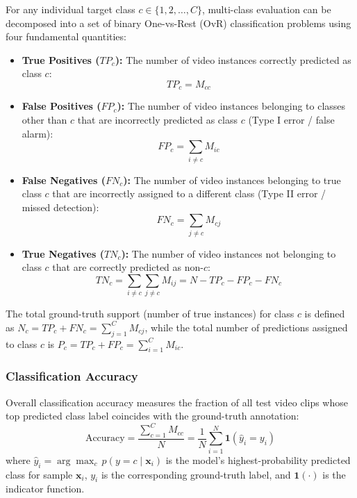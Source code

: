 For any individual target class $c \in \{1, 2, \dots, C\}$, multi-class evaluation can be decomposed into a set of binary One-vs-Rest (OvR) classification problems using four fundamental quantities:
\begin{itemize}[leftmargin=*]
    \item \textbf{True Positives ($TP_c$):} The number of video instances correctly predicted as class $c$:
    \begin{equation}
    TP_c = M_{cc}
    \end{equation}
    \item \textbf{False Positives ($FP_c$):} The number of video instances belonging to classes other than $c$ that are incorrectly predicted as class $c$ (Type I error / false alarm):
    \begin{equation}
    FP_c = \sum_{i \neq c} M_{ic}
    \end{equation}
    \item \textbf{False Negatives ($FN_c$):} The number of video instances belonging to true class $c$ that are incorrectly assigned to a different class (Type II error / missed detection):
    \begin{equation}
    FN_c = \sum_{j \neq c} M_{cj}
    \end{equation}
    \item \textbf{True Negatives ($TN_c$):} The number of video instances not belonging to class $c$ that are correctly predicted as non-$c$:
    \begin{equation}
    TN_c = \sum_{i \neq c} \sum_{j \neq c} M_{ij} = N - TP_c - FP_c - FN_c
    \end{equation}
\end{itemize}
The total ground-truth support (number of true instances) for class $c$ is defined as $N_c = TP_c + FN_c = \sum_{j=1}^C M_{cj}$, while the total number of predictions assigned to class $c$ is $P_c = TP_c + FP_c = \sum_{i=1}^C M_{ic}$.

\subsubsection{Classification Accuracy}

Overall classification accuracy measures the fraction of all test video clips whose top predicted class label coincides with the ground-truth annotation:
\begin{equation}
\text{Accuracy} = \frac{\sum_{c=1}^{C} M_{cc}}{N} = \frac{1}{N}\sum_{i=1}^{N} \mathbf{1}\left(\hat{y}_i = y_i\right)
\end{equation}
where $\hat{y}_i = \arg\max_c \, p(y=c \mid \mathbf{x}_i)$ is the model's highest-probability predicted class for sample $\mathbf{x}_i$, $y_i$ is the corresponding ground-truth label, and $\mathbf{1}(\cdot)$ is the indicator function. 

